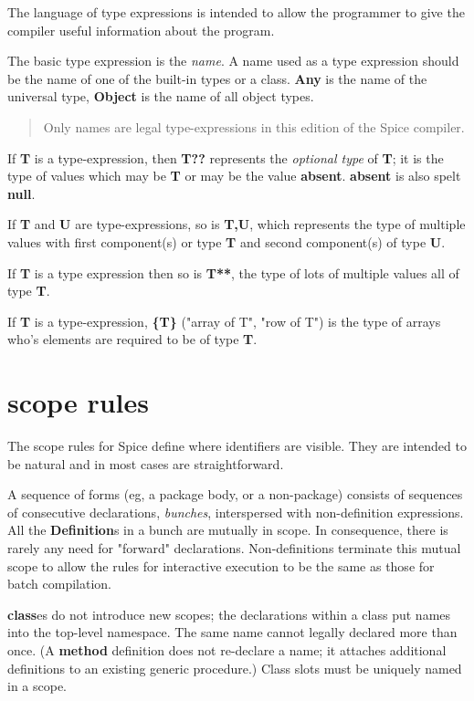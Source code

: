 \documentclass{report}
\begin{document}
The language of type expressions is intended to allow the programmer
to give the compiler useful information about the program.

The basic type expression is the {\em name}. A name used as a type
expression should be the name of one of the built-in types or a
class. {\bf Any} is the name of the universal type, {\bf Object} is the
name of all object types.

\begin{quote}Only names are legal type-expressions in this edition of the Spice
compiler.\end{quote}If {\bf T} is a type-expression, then {\bf T??} represents the {\em optional type}
of {\bf T}; it is the type of values which may be {\bf T} or may be the value
{\bf absent}. {\bf absent} is also spelt {\bf null}.

If {\bf T} and {\bf U} are type-expressions, so is {\bf T,U}, which represents the
type of multiple values with first component(s) or type {\bf T} and second
component(s) of type {\bf U}.

If {\bf T} is a type expression then so is {\bf T**}, the type of lots of
multiple values all of type {\bf T}.

If {\bf T} is a type-expression, {\bf \{T\}} ("array of T", "row of T") is the
type of arrays who's elements are required to be of type {\bf T}.\chapter{scope rules}


The scope rules for Spice define where identifiers are visible. They are
intended to be natural and in most cases are straightforward.

A sequence of forms (eg, a package body, or a non-package)
consists of sequences of consecutive declarations, {\em bunches}, interspersed
with non-definition expressions. All the {\bf Definition}s in a bunch are mutually
in scope. In consequence, there is rarely any need for "forward" declarations.
Non-definitions terminate this mutual scope to allow the rules for interactive
execution to be the same as those for batch compilation.

{\bf class}es do not introduce new scopes; the declarations within a class put
names into the top-level namespace. The same name cannot legally declared more
than once. (A {\bf method} definition does not re-declare a name; it attaches
additional definitions to an existing generic procedure.) Class slots must be
uniquely named in a scope.
\end{document}
